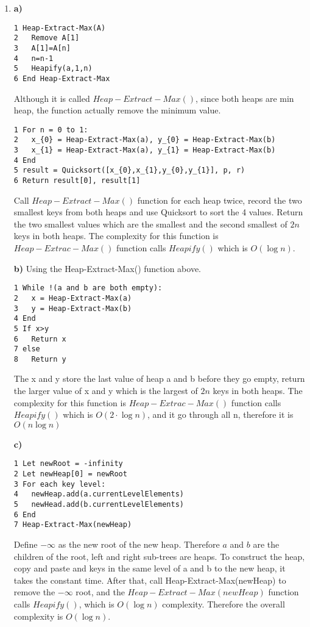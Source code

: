 \documentclass{article}
\begin{document}
\begin{enumerate}
\item {\bf a)}
\begin{verbatim}
1 Heap-Extract-Max(A) 
2   Remove A[1] 
3   A[1]=A[n] 
4   n=n-1 
5   Heapify(a,1,n) 
6 End Heap-Extract-Max
\end{verbatim}
Although it is called $Heap-Extract-Max()$, since both heaps are min heap, the function actually remove the minimum value.
\begin{verbatim}
1 For n = 0 to 1:
2   x_{0} = Heap-Extract-Max(a), y_{0} = Heap-Extract-Max(b)
3   x_{1} = Heap-Extract-Max(a), y_{1} = Heap-Extract-Max(b)
4 End
5 result = Quicksort([x_{0},x_{1},y_{0},y_{1}], p, r)
6 Return result[0], result[1]
\end{verbatim}
Call $Heap-Extract-Max()$ function for each heap twice, record the two smallest keys from both heaps and use Quicksort to sort the 4 values. Return the two smallest values which are the smallest and the second smallest of $2n$ keys in both heaps. The complexity for this function is $Heap-Extrac-Max()$ function calls $Heapify()$ which is $O(\log n)$.

{\bf b)}
Using the Heap-Extract-Max() function above.
\begin{verbatim}
1 While !(a and b are both empty):
2   x = Heap-Extract-Max(a)
3   y = Heap-Extract-Max(b)
4 End
5 If x>y
6   Return x
7 else
8   Return y  
\end{verbatim}
The x and y store the last value of heap a and b before they go empty, return the larger value of x and y which is the largest of $2n$ keys in both heaps. The complexity for this function is $Heap-Extrac-Max()$ function calls $Heapify()$ which is $O(2\cdot \log n)$, and it go through all n, therefore it is $O(n\log n)$

{\bf c)}
\begin{verbatim}
1 Let newRoot = -infinity
2 Let newHeap[0] = newRoot
3 For each key level:
4   newHeap.add(a.currentLevelElements)
5   newHead.add(b.currentLevelElements)
6 End
7 Heap-Extract-Max(newHeap)
\end{verbatim}
Define $-\infty$ as the new root of the new heap. Therefore $a$ and $b$ are the children of the root, left and right sub-trees are heaps. To construct the heap, copy and paste and keys in the same level of a and b to the new heap, it takes the constant time. After that, call Heap-Extract-Max(newHeap) to remove the $-\infty$ root, and the $Heap-Extract-Max(newHeap)$ function calls $Heapify()$, which is $O(\log n)$ complexity. Therefore the overall complexity is $O(\log n)$.


\end{enumerate}
\end{document}
